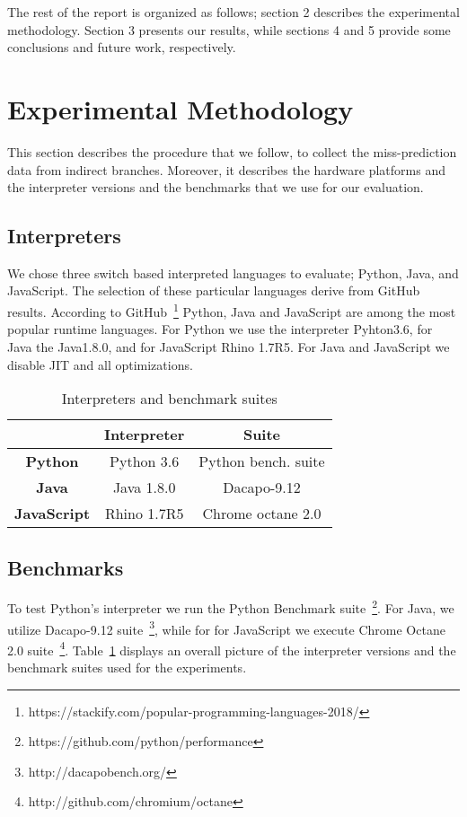 \documentclass[parskip=full, paper=a4, fontsize=12pt]{scrartcl}
\numberwithin{equation}{section}
\numberwithin{figure}{section}
\numberwithin{table}{section}
\begin{document}
The rest of the report is organized as follows; section 2 describes the
experimental methodology.  Section 3 presents our results, while
sections 4 and 5 provide some conclusions and future work,
respectively.  

\section{Experimental Methodology}
This section describes the procedure that we follow, to collect the
miss-prediction data from indirect branches. Moreover, it describes the
hardware platforms and the interpreter versions and the benchmarks
that we use for our evaluation. 

\subsection{Interpreters}
We chose three switch based interpreted languages to evaluate; Python,
Java, and JavaScript. The selection of these particular languages
derive from GitHub results. According to
GitHub~\footnote{https://stackify.com/popular-programming-languages-2018/}
Python, Java and JavaScript are among the most popular runtime
languages. For Python we use the interpreter Pyhton3.6, for Java the
Java1.8.0, and for JavaScript Rhino 1.7R5. For Java and JavaScript we
disable JIT and all optimizations. 

\begin{table}[]
	\centering
	\caption{Interpreters and benchmark suites}
	\label{tab:inter_bench}
	\begin{tabular}{|c|c|c|}
		\hline
		\textbf{}           & \textbf{Interpreter} & \textbf{Suite}      \\ 
        \hline
		\textbf{Python}     & Python 3.6           & Python bench. suite \\ 
        \hline
		\textbf{Java}       & Java 1.8.0           & Dacapo-9.12         \\ 
        \hline
		\textbf{JavaScript} & Rhino 1.7R5          & Chrome octane 2.0   \\ 
        \hline
	\end{tabular}
\end{table}

\subsection{Benchmarks} 
To test Python's interpreter we run the Python Benchmark
suite~\footnote{https://github.com/python/performance}. For Java, we
utilize Dacapo-9.12 suite~\footnote{http://dacapobench.org/}, while
for for JavaScript we execute Chrome Octane 2.0
suite~\footnote{http://github.com/chromium/octane}.
Table~\ref{tab:inter_bench} displays an overall picture of the interpreter
versions and the benchmark suites used for the experiments.
\end{document}
